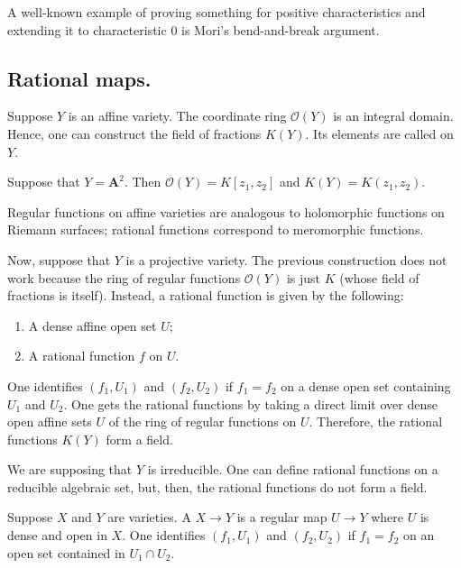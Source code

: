 \documentclass [11 pt, oneside] {article}
\begin{document}
\begin{remark}
	A well-known example of proving something for positive characteristics and extending it to characteristic $0$ is Mori's bend-and-break argument.
\end{remark}

\subsection{Rational maps.}
Suppose $Y$ is an affine variety. The coordinate ring $\mathscr{O}(Y)$ is an integral domain. Hence, one can construct the field of fractions $K(Y)$. Its elements are called  on $Y$.

\begin{example}[ ]\label{}
Suppose that $Y=\mathbf{A}^2$. Then $\mathscr{O}(Y) = K[z_1,z_2]$ and $K(Y) =K(z_1,z_2)$. 
\end{example}

\begin{remark}
	Regular functions on affine varieties are analogous to holomorphic functions on Riemann surfaces; rational functions correspond to meromorphic functions.
\end{remark}

Now, suppose that $Y$ is a projective variety. The previous construction does not work because the ring of regular functions $\mathscr{O}(Y)$ is just $K$ (whose field of fractions is itself). Instead, a rational function is given by the following:
 \begin{enumerate}
	\item A dense affine open set $U$;
	\item A rational function $f$ on $U$.
\end{enumerate}
One identifies $(f_1,U_1)$ and $(f_2,U_2)$ if $f_1=f_2$ on a dense open set containing $U_1$ and $U_2$. One gets the rational functions by taking a direct limit over dense open affine sets $U$ of the ring of regular functions on $U$. Therefore, the rational functions $K(Y)$ form a field.

\begin{remark}
	We are supposing that $Y$ is irreducible. One can define rational functions on a reducible algebraic set, but, then, the rational functions do not form a field.
\end{remark}

Suppose $X$ and $Y$ are varieties. A  $X\longrightarrow Y$ is a regular map $U\longrightarrow Y$ where $U$ is dense and open in $X$. One identifies $(f_1,U_1)$ and $(f_2,U_2)$ if $f_1=f_2$ on an open set contained in $U_1\cap U_2$.
\end{document}
